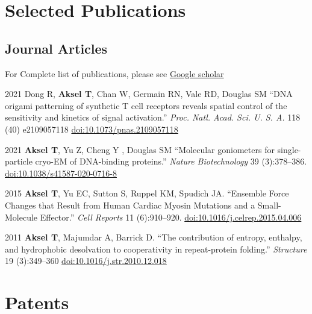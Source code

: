 \documentclass[12pt,letterpaper]{report}
\begin{document}
    \section*{Selected Publications}

    \subsection*{Journal Articles}
    For Complete list of publications, please see \href{https://scholar.google.com/citations?user=K91MviEAAAAJ&hl=en}{Google scholar}\\

    \begin{tablist}

        \item[2021] \tab{}Dong R, \textbf{Aksel T}, Chan W, Germain RN, Vale RD, Douglas SM \enquote{DNA origami patterning of synthetic T cell receptors reveals spatial control of the sensitivity and kinetics of signal activation.} \textit{Proc. Natl. Acad. Sci. U. S. A.} 118 (40) e2109057118 \href{https://doi.org/10.1073/pnas.2109057118}{doi:10.1073/pnas.2109057118}

        \item[2021] \tab{}\textbf{Aksel T}, Yu Z, Cheng Y , Douglas SM \enquote{Molecular goniometers for single-particle cryo-EM of DNA-binding proteins.} \textit{Nature Biotechnology} 39 (3):378--386. \href{https://doi.org/10.1038/s41587-020-0716-8}{doi:10.1038/s41587-020-0716-8}

        \item[2015] \tab{}\textbf{Aksel T}, Yu EC, Sutton S, Ruppel KM, Spudich JA. \enquote{Ensemble Force Changes that Result from Human Cardiac Myosin Mutations and a Small-Molecule Effector.} \textit{Cell Reports} 11 (6):910--920. \href{https://doi.org/10.1016/j.celrep.2015.04.006}{doi:10.1016/j.celrep.2015.04.006}

        \item[2011] \tab{}\textbf{Aksel T}, Majumdar A, Barrick D. \enquote{The contribution of entropy, enthalpy, and hydrophobic desolvation to cooperativity in repeat-protein folding.} \textit{Structure} 19 (3):349--360 \href{https://doi.org/10.1016/j.str.2010.12.018}{doi:10.1016/j.str.2010.12.018}

    \end{tablist}
    
    \section*{Patents}
\end{document}
